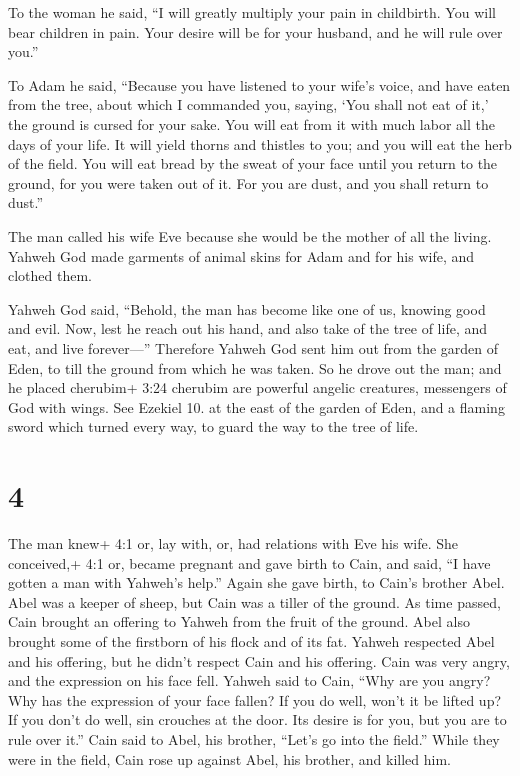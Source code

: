  To the woman he said, ``I will greatly multiply your pain
in childbirth. You will bear children in pain. Your desire will be for
your husband, and he will rule over you.''

 To Adam he said, ``Because you have listened to your
wife's voice, and have eaten from the tree, about which I commanded you,
saying, `You shall not eat of it,' the ground is cursed for your sake.
You will eat from it with much labor all the days of your life.
 It will yield thorns and thistles to you; and you will eat
the herb of the field.  You will eat bread by the sweat of
your face until you return to the ground, for you were taken out of it.
For you are dust, and you shall return to dust.''

 The man called his wife Eve because she would be the
mother of all the living.  Yahweh God made garments of
animal skins for Adam and for his wife, and clothed them.

 Yahweh God said, ``Behold, the man has become like one of
us, knowing good and evil. Now, lest he reach out his hand, and also
take of the tree of life, and eat, and live forever---'' 
Therefore Yahweh God sent him out from the garden of Eden, to till the
ground from which he was taken.  So he drove out the man;
and he placed cherubim+ 3:24 cherubim are powerful angelic creatures,
messengers of God with wings. See Ezekiel 10. at the east of the garden
of Eden, and a flaming sword which turned every way, to guard the way to
the tree of life.

\hypertarget{section-3}{%
\section{4}\label{section-3}}

 The man knew+ 4:1 or, lay with, or, had relations with Eve
his wife. She conceived,+ 4:1 or, became pregnant and gave birth to
Cain, and said, ``I have gotten a man with Yahweh's help.'' 
Again she gave birth, to Cain's brother Abel. Abel was a keeper of
sheep, but Cain was a tiller of the ground.  As time passed,
Cain brought an offering to Yahweh from the fruit of the ground.
 Abel also brought some of the firstborn of his flock and of
its fat. Yahweh respected Abel and his offering,  but he
didn't respect Cain and his offering. Cain was very angry, and the
expression on his face fell.  Yahweh said to Cain, ``Why are
you angry? Why has the expression of your face fallen?  If
you do well, won't it be lifted up? If you don't do well, sin crouches
at the door. Its desire is for you, but you are to rule over it.''
 Cain said to Abel, his brother, ``Let's go into the
field.'' While they were in the field, Cain rose up against Abel, his
brother, and killed him.

